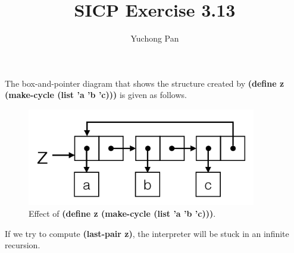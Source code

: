 \documentclass[11pt, oneside]{article}
\title{SICP Exercise 3.13}
\author{Yuchong Pan}
\begin{document}
\maketitle

The box-and-pointer diagram that shows the structure created by \textbf{(define z (make-cycle (list 'a 'b 'c)))} is given as follows.

\begin{figure}[h!]
    \centering\includegraphics[width=10cm]{ex-3.13.png}
    \caption{Effect of \textbf{(define z (make-cycle (list 'a 'b 'c)))}.}
\end{figure}

If we try to compute \textbf{(last-pair z)}, the interpreter will be stuck in an infinite recursion.
\end{document}
